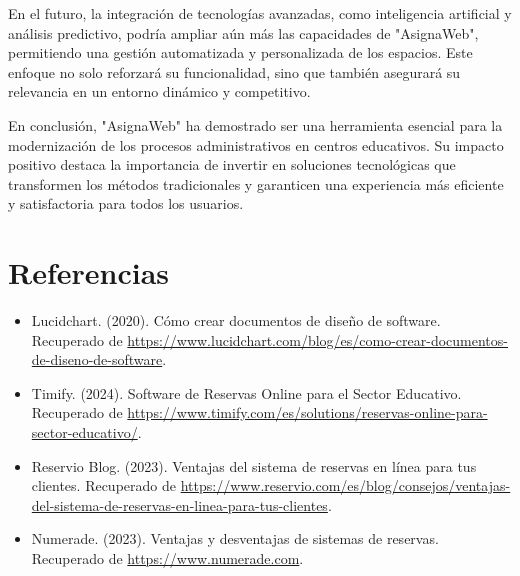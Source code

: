 \documentclass[12pt,a4paper]{article}
\begin{document}
\begin{multicols}{2}
En el futuro, la integración de tecnologías avanzadas, como inteligencia artificial y análisis predictivo, podría ampliar aún más las capacidades de "AsignaWeb", permitiendo una gestión automatizada y personalizada de los espacios. Este enfoque no solo reforzará su funcionalidad, sino que también asegurará su relevancia en un entorno dinámico y competitivo.

En conclusión, "AsignaWeb" ha demostrado ser una herramienta esencial para la modernización de los procesos administrativos en centros educativos. Su impacto positivo destaca la importancia de invertir en soluciones tecnológicas que transformen los métodos tradicionales y garanticen una experiencia más eficiente y satisfactoria para todos los usuarios.


\section*{Referencias}
\begin{itemize}
    \item Lucidchart. (2020). Cómo crear documentos de diseño de software. Recuperado de \url{https://www.lucidchart.com/blog/es/como-crear-documentos-de-diseno-de-software}.
    \item Timify. (2024). Software de Reservas Online para el Sector Educativo. Recuperado de \url{https://www.timify.com/es/solutions/reservas-online-para-sector-educativo/}.
    \item Reservio Blog. (2023). Ventajas del sistema de reservas en línea para tus clientes. Recuperado de \url{https://www.reservio.com/es/blog/consejos/ventajas-del-sistema-de-reservas-en-linea-para-tus-clientes}.
    \item Numerade. (2023). Ventajas y desventajas de sistemas de reservas. Recuperado de \url{https://www.numerade.com}.
\end{itemize}

\end{multicols}
\end{document}
